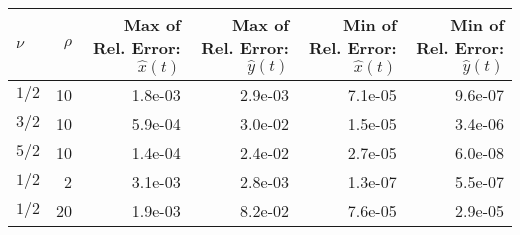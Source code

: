 \begin{tabular}{lrrrrr}
\toprule
$\nu$ & $\rho$ & Max of Rel. Error: $\hat{x}(t)$ & Max of Rel. Error: $\hat{y}(t)$ & Min of Rel. Error: $\hat{x}(t)$ & Min of Rel. Error: $\hat{y}(t)$ \\
\midrule
$1/2$ & 10 & 1.8e-03 & 2.9e-03 & 7.1e-05 & 9.6e-07 \\
$3/2$ & 10 & 5.9e-04 & 3.0e-02 & 1.5e-05 & 3.4e-06 \\
$5/2$ & 10 & 1.4e-04 & 2.4e-02 & 2.7e-05 & 6.0e-08 \\
$1/2$ & 2 & 3.1e-03 & 2.8e-03 & 1.3e-07 & 5.5e-07 \\
$1/2$ & 20 & 1.9e-03 & 8.2e-02 & 7.6e-05 & 2.9e-05 \\
\bottomrule
\end{tabular}
